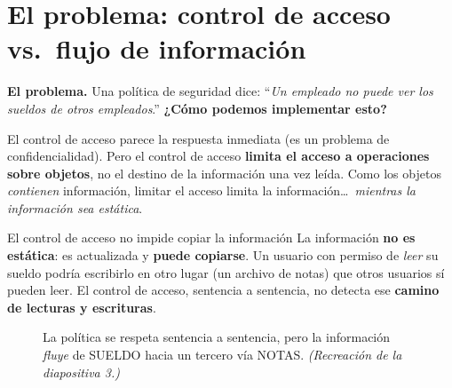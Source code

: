 \documentclass[11pt,a4paper]{article}
\begin{document}
\section{El problema: control de acceso vs.\ flujo de información}

\begin{slidebox}
\textbf{El problema.} Una política de seguridad dice: ``\emph{Un empleado no puede ver los
sueldos de otros empleados}.'' \quad\textbf{¿Cómo podemos implementar esto?}
\end{slidebox}

El control de acceso parece la respuesta inmediata (es un problema de confidencialidad). Pero
el control de acceso \textbf{limita el acceso a operaciones sobre objetos}, no el destino de
la información una vez leída. Como los objetos \emph{contienen} información, limitar el acceso
limita la información\dots\ \emph{mientras la información sea estática}.

\begin{warnbox}{El control de acceso no impide copiar la información}
La información \textbf{no es estática}: es actualizada y \textbf{puede copiarse}. Un usuario
con permiso de \emph{leer} su sueldo podría escribirlo en otro lugar (un archivo de notas) que
otros usuarios sí pueden leer. El control de acceso, sentencia a sentencia, no detecta ese
\textbf{camino de lecturas y escrituras}.
\end{warnbox}

\begin{figure}[h]
\centering
{}
\caption{La política se respeta sentencia a sentencia, pero la información \emph{fluye} de
SUELDO hacia un tercero vía NOTAS. \textit{(Recreación de la diapositiva 3.)}}
\end{figure}
\end{document}
